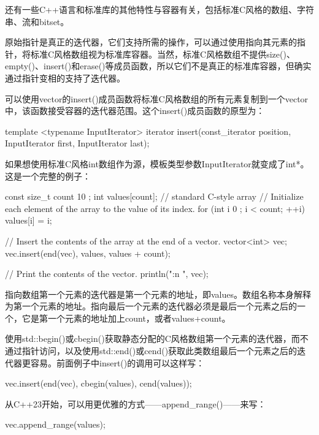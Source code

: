 
还有一些C++语言和标准库的其他特性与容器有关，包括标准C风格的数组、字符串、流和bitset。


原始指针是真正的迭代器，它们支持所需的操作，可以通过使用指向其元素的指针，将标准C风格数组视为标准库容器。当然，标准C风格数组不提供size()、empty()、insert()和erase()等成员函数，所以它们不是真正的标准库容器，但确实通过指针变相的支持了迭代器。

可以使用vector的insert()成员函数将标准C风格数组的所有元素复制到一个vector中，该函数接受容器的迭代器范围。这个insert()成员函数的原型为：

\begin{cpp}
template <typename InputIterator> iterator insert(const_iterator position,
    InputIterator first, InputIterator last);
\end{cpp}

如果想使用标准C风格int数组作为源，模板类型参数InputIterator就变成了int*。这是一个完整的例子：

\begin{cpp}
const size_t count { 10 };
int values[count]; // standard C-style array
// Initialize each element of the array to the value of its index.
for (int i { 0 }; i < count; ++i) { values[i] = i; }

// Insert the contents of the array at the end of a vector.
vector<int> vec;
vec.insert(end(vec), values, values + count);

// Print the contents of the vector.
println("{:n} ", vec);
\end{cpp}

指向数组第一个元素的迭代器是第一个元素的地址，即values。数组名称本身解释为第一个元素的地址。指向最后一个元素的迭代器必须是最后一个元素之后的一个，它是第一个元素的地址加上count，或者values+count。

使用std::begin()或cbegin()获取静态分配的C风格数组第一个元素的迭代器，而不通过指针访问，以及使用std::end()或cend()获取此类数组最后一个元素之后的迭代器更容易。前面例子中insert()的调用可以这样写：

\begin{cpp}
vec.insert(end(vec), cbegin(values), cend(values));
\end{cpp}

从C++23开始，可以用更优雅的方式——append\_range()——来写：

\begin{cpp}
vec.append_range(values);
\end{cpp}

